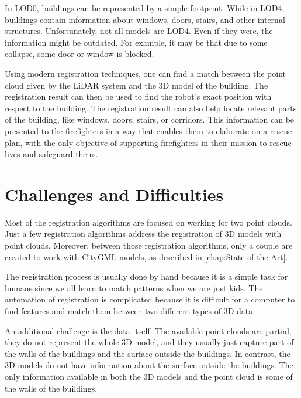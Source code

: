         In LOD0, buildings can be represented by a simple footprint. While in LOD4, buildings contain information about windows, doors, stairs, and other internal structures.
        Unfortunately, not all models are LOD4. Even if they were, the information might be outdated. For example, it may be that due to some collapse, some door or window is blocked.
        \par
        Using modern registration techniques, one can find a match between the point cloud given by the LiDAR system and the 3D model of the building.
        The registration result can then be used to find the robot’s exact position with respect to the building.
        The registration result can also help locate relevant parts of the building, like windows, doors, stairs, or corridors.
        This information can be presented to the firefighters in a way that enables them to elaborate on a rescue plan, with the only objective of 
        supporting firefighters in their mission to rescue lives and safeguard theirs.

    \section{Challenges and Difficulties}
    
        Most of the registration algorithms are focused on working for two point clouds.
        Just a few registration algorithms address the registration of 3D models with point clouds.
        Moreover, between those registration algorithms, only a couple are created to work with CityGML models, as described in \autoref{chap:State of the Art}.
        \par      
        The registration process is usually done by hand because it is a simple task for humans since we all learn to match patterns when we are just kids. 
        The automation of registration is complicated because it is difficult for a computer to find features and match them between two different types of 3D data.
        \par
        An additional challenge is the data itself. The available point clouds are partial, they do not represent the whole 3D model, 
        and they usually just capture part of the walls of the buildings and the surface outside the buildings. 
        In contrast, the 3D models do not have information about the surface outside the buildings. 
        The only information available in both the 3D models and the point cloud is some of the walls of the buildings.
        \par
        

